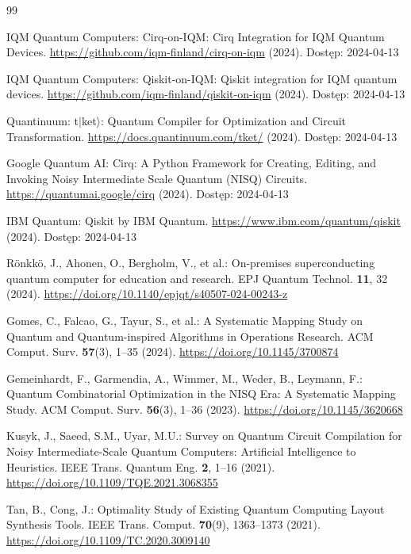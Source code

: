 \begin{thebibliography}{99}

IQM Quantum Computers: Cirq-on-IQM: Cirq Integration for IQM Quantum Devices. \url{https://github.com/iqm-finland/cirq-on-iqm} (2024). Dostęp: 2024-04-13

IQM Quantum Computers: Qiskit-on-IQM: Qiskit integration for IQM quantum devices. \url{https://github.com/iqm-finland/qiskit-on-iqm} (2024). Dostęp: 2024-04-13

Quantinuum: t$|$ket$\rangle$: Quantum Compiler for Optimization and Circuit Transformation. \url{https://docs.quantinuum.com/tket/} (2024). Dostęp: 2024-04-13

Google Quantum AI: Cirq: A Python Framework for Creating, Editing, and Invoking Noisy Intermediate Scale Quantum (NISQ) Circuits. \url{https://quantumai.google/cirq} (2024). Dostęp: 2024-04-13

IBM Quantum: Qiskit by IBM Quantum. \url{https://www.ibm.com/quantum/qiskit} (2024). Dostęp: 2024-04-13

Rönkkö, J., Ahonen, O., Bergholm, V., et al.: On-premises superconducting quantum computer for education and research. EPJ Quantum Technol. \textbf{11}, 32 (2024). \url{https://doi.org/10.1140/epjqt/s40507-024-00243-z}

Gomes, C., Falcao, G., Tayur, S., et al.: A Systematic Mapping Study on Quantum and Quantum-inspired Algorithms in Operations Research. ACM Comput. Surv. \textbf{57}(3), 1--35 (2024). \url{https://doi.org/10.1145/3700874}

Gemeinhardt, F., Garmendia, A., Wimmer, M., Weder, B., Leymann, F.: Quantum Combinatorial Optimization in the NISQ Era: A Systematic Mapping Study. ACM Comput. Surv. \textbf{56}(3), 1--36 (2023). \url{https://doi.org/10.1145/3620668}

Kusyk, J., Saeed, S.M., Uyar, M.U.: Survey on Quantum Circuit Compilation for Noisy Intermediate-Scale Quantum Computers: Artificial Intelligence to Heuristics. IEEE Trans. Quantum Eng. \textbf{2}, 1--16 (2021). \url{https://doi.org/10.1109/TQE.2021.3068355}

Tan, B., Cong, J.: Optimality Study of Existing Quantum Computing Layout Synthesis Tools. IEEE Trans. Comput. \textbf{70}(9), 1363--1373 (2021). \url{https://doi.org/10.1109/TC.2020.3009140}


\end{thebibliography}
